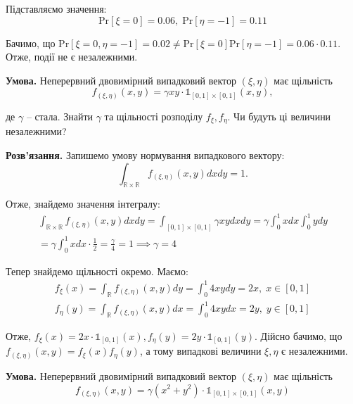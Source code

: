 \documentclass[oneside,solution]{karazin-prob-theory-assign}
\begin{document}
Підставляємо значення:
\begin{equation}
    \text{Pr}[\xi=0] = 0.06, \; \text{Pr}[\eta=-1] = 0.11
\end{equation}

Бачимо, що $\text{Pr}[\xi=0,\eta=-1]=0.02 \neq \text{Pr}[\xi=0]\text{Pr}[\eta=-1]=0.06 \cdot 0.11$. Отже, події не є незалежними.


\hspace{20px}\textbf{Умова.} Неперервний двовимірний випадковий вектор $(\xi,\eta)$ має щільність
\begin{equation}
    f_{(\xi,\eta)}(x,y) = \gamma xy \cdot \mathds{1}_{[0,1]\times [0,1]}(x,y),
\end{equation}

де $\gamma$ -- стала. Знайти $\gamma$ та щільності розподілу $f_{\xi},f_{\eta}$. Чи будуть ці величини незалежними? 

\textbf{Розв'язання.} Запишемо умову нормування випадкового вектору:
\begin{equation}
    \int_{\mathbb{R} \times \mathbb{R}} f_{(\xi,\eta)}(x,y)dxdy = 1.
\end{equation}

Отже, знайдемо значення інтегралу:
\begin{gather}
    \int_{\mathbb{R} \times \mathbb{R}}f_{(\xi,\eta)}(x,y)dxdy = \int_{[0,1] \times [0,1]} \gamma xydxdy = \gamma \int_0^1 xdx \int_0^1 ydy \\
    = \gamma \int_0^1 xdx \cdot \frac{1}{2} = \frac{\gamma}{4} = 1 \implies \boxed{\gamma = 4}
\end{gather}

Тепер знайдемо щільності окремо. Маємо:
\begin{gather}
    f_{\xi}(x) = \int_{\mathbb{R}}f_{(\xi,\eta)}(x,y)dy = \int_0^1 4xydy = 2x, \; x \in [0,1] \\
    f_{\eta}(y) = \int_{\mathbb{R}}f_{(\xi,\eta)}(x,y)dx = \int_0^1 4xydx = 2y, \; y \in [0,1]
\end{gather}

Отже, $f_{\xi}(x) = 2x\cdot \mathds{1}_{[0,1]}(x), f_{\eta}(y) = 2y\cdot\mathds{1}_{[0,1]}(y)$. Дійсно бачимо, що $f_{(\xi,\eta)}(x,y)=f_{\xi}(x)f_{\eta}(y)$, а тому випадкові величини $\xi,\eta$ є незалежними.


\hspace{20px}\textbf{Умова.} Неперервний двовимірний випадковий вектор $(\xi,\eta)$ має щільність
\begin{equation}
    f_{(\xi,\eta)}(x,y) = \gamma(x^2+y^2) \cdot \mathds{1}_{[0,1]\times [0,1]}(x,y)
\end{equation}
\end{document}
